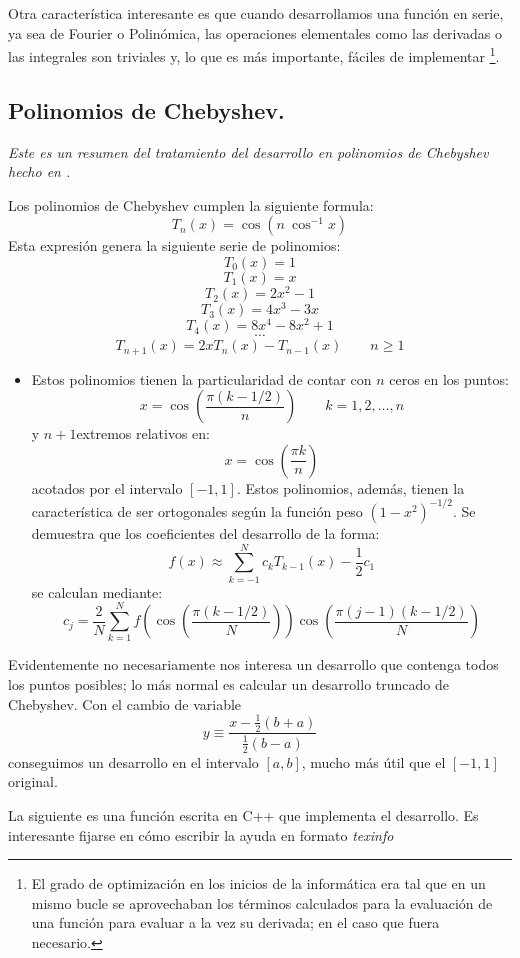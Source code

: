 Otra característica interesante es que cuando desarrollamos una
función en serie, ya sea de Fourier o Polinómica, las operaciones
elementales como las derivadas o las integrales son triviales y, lo
que es más importante, fáciles de implementar%
\footnote{El grado de optimización en los inicios de la informática
  era tal que en un mismo bucle se aprovechaban los términos
  calculados para la evaluación de una función para evaluar a la vez
  su derivada; en el caso que fuera necesario.%
}.


\subsection{Polinomios de Chebyshev.}

\emph{Este es un resumen del tratamiento del desarrollo en polinomios
  de Chebyshev hecho en \cite{Numerical}.}

Los polinomios de Chebyshev cumplen la siguiente formula:
$$T_{n}(x)=\cos(n\ \cos^{-1}x)$$
Esta expresión genera la siguiente serie de polinomios:
$$ T_{0}(x)=1$$
$$
T_{1}(x)=x$$
$$
T_{2}(x)=2x^{2}-1$$
$$
T_{3}(x)=4x^{3}-3x$$
$$
T_{4}(x)=8x^{4}-8x^{2}+1$$
$$
\cdots$$
$$
T_{n+1}(x)=2xT_{n}(x)-T_{n-1}(x)\qquad n\geq1$$


\begin{itemize}
\item Estos polinomios tienen la particularidad de contar con $n$
  ceros en los puntos:
$$x=\cos\left(\frac{\pi(k-1/2)}{n}\right)\qquad
k=1,2,\ldots,n$$ y $n+1$extremos relativos en:
$$  x=\cos\left(\frac{\pi k}{n}\right)$$
acotados por el intervalo $[-1,1]$. Estos polinomios, además, tienen
la característica de ser ortogonales según la función peso
$(1-x^{2})^{-1/2}$.  Se demuestra que los coeficientes del desarrollo
de la forma:
$$
f(x)\approx\sum_{k=-1}^{N}c_{k}T_{k-1}(x)-\frac{1}{2}c_{1}$$ se
calculan mediante:
$$  c_{j}=\frac{2}{N}\sum_{k=1}^{N}f
\left( \cos\left(\frac{\pi(k-1/2)}{N}\right) \right)
\cos\left(\frac{\pi(j-1)(k-1/2)}{N}\right)$$

\end{itemize}
Evidentemente no necesariamente nos interesa un desarrollo que
contenga todos los puntos posibles; lo más normal es calcular un
desarrollo truncado de Chebyshev. Con el cambio de variable$$
y\equiv\frac{x-\frac{1}{2}(b+a)}{\frac{1}{2}(b-a)}$$ conseguimos un
desarrollo en el intervalo $[a,b]$, mucho más útil que el $[-1,1]$
original.

La siguiente es una función escrita en C++ que implementa el
desarrollo.  Es interesante fijarse en cómo escribir la ayuda en
formato \textit{texinfo}

